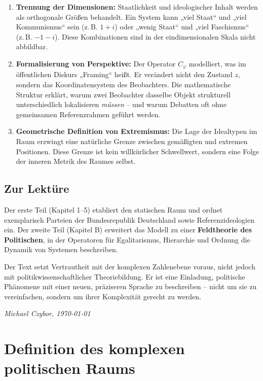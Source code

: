 \documentclass[12pt, a4paper]{article}
\begin{document}
\begin{enumerate}
    \item \textbf{Trennung der Dimensionen:} Staatlichkeit und ideologischer Inhalt werden als orthogonale Größen behandelt. Ein System kann „viel Staat“ und „viel Kommunismus“ sein (z.\,B. \(1+i\)) oder „wenig Staat“ und „viel Faschismus“ (z.\,B. \(-1-i\)). Diese Kombinationen sind in der eindimensionalen Skala nicht abbildbar.
    \item \textbf{Formalisierung von Perspektive:} Der Operator \(C_\varphi\) modelliert, was im öffentlichen Diskurs „Framing“ heißt. Er verändert nicht den Zustand \(z\), sondern das Koordinatensystem des Beobachters. Die mathematische Struktur erklärt, warum zwei Beobachter dasselbe Objekt strukturell unterschiedlich lokalisieren \emph{müssen} – und warum Debatten oft ohne gemeinsamen Referenzrahmen geführt werden.
    \item \textbf{Geometrische Definition von Extremismus:} Die Lage der Idealtypen im Raum erzwingt eine natürliche Grenze zwischen gemäßigten und extremen Positionen. Diese Grenze ist kein willkürlicher Schwellwert, sondern eine Folge der inneren Metrik des Raumes selbst.
\end{enumerate}

\subsection*{Zur Lektüre}

Der erste Teil (Kapitel 1--5) etabliert den statischen Raum und ordnet exemplarisch Parteien der Bundesrepublik Deutschland sowie Referenzideologien ein. Der zweite Teil (Kapitel B) erweitert das Modell zu einer \textbf{Feldtheorie des Politischen}, in der Operatoren für Egalitarismus, Hierarchie und Ordnung die Dynamik von Systemen beschreiben.

Der Text setzt Vertrautheit mit der komplexen Zahlenebene voraus, nicht jedoch mit politikwissenschaftlicher Theoriebildung. Er ist eine Einladung, politische Phänomene mit einer neuen, präziseren Sprache zu beschreiben – nicht um sie zu vereinfachen, sondern um ihrer Komplexität gerecht zu werden.

\vspace{1cm}
\hfill \textit{Michael Czybor, \today}

\newpage

\section*{Definition des komplexen politischen Raums}
\end{document}
